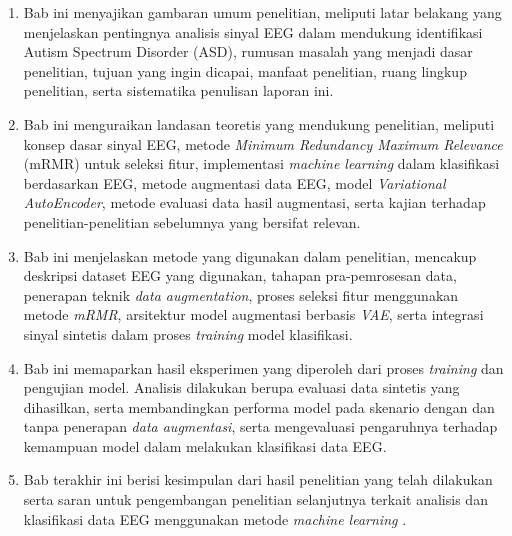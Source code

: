 \begin{enumerate}
    \item {} 
    Bab ini menyajikan gambaran umum penelitian, meliputi latar belakang yang menjelaskan pentingnya analisis sinyal EEG dalam mendukung identifikasi Autism Spectrum Disorder (ASD), rumusan masalah yang menjadi dasar penelitian, tujuan yang ingin dicapai, manfaat penelitian, ruang lingkup penelitian, serta sistematika penulisan laporan ini.
    
    \item {} 
    Bab ini menguraikan landasan teoretis yang mendukung penelitian, meliputi konsep dasar sinyal EEG, metode \textit{Minimum Redundancy Maximum Relevance} (mRMR) untuk seleksi fitur, implementasi \textit{machine learning}  dalam klasifikasi berdasarkan EEG, metode augmentasi data EEG, model \textit{Variational AutoEncoder}, metode evaluasi data hasil augmentasi, serta kajian terhadap penelitian-penelitian sebelumnya yang bersifat relevan.
    
    \item {} 
    Bab ini menjelaskan metode yang digunakan dalam penelitian, mencakup deskripsi dataset EEG yang digunakan, tahapan pra-pemrosesan data, penerapan teknik \textit{data augmentation}, proses seleksi fitur menggunakan metode \textit{mRMR}, arsitektur model augmentasi berbasis \textit{VAE}, serta integrasi sinyal sintetis dalam proses \textit{training} model klasifikasi.
    
    \item {} 
    Bab ini memaparkan hasil eksperimen yang diperoleh dari proses \textit{training} dan pengujian model. Analisis dilakukan berupa evaluasi data sintetis yang dihasilkan, serta membandingkan performa model pada skenario dengan dan tanpa penerapan \textit{data augmentasi}, serta mengevaluasi pengaruhnya terhadap kemampuan model dalam melakukan klasifikasi data EEG.
    
    \item {} 
    Bab terakhir ini berisi kesimpulan dari hasil penelitian yang telah dilakukan serta saran untuk pengembangan penelitian selanjutnya terkait analisis dan klasifikasi data EEG menggunakan metode \textit{machine learning} .
\end{enumerate}